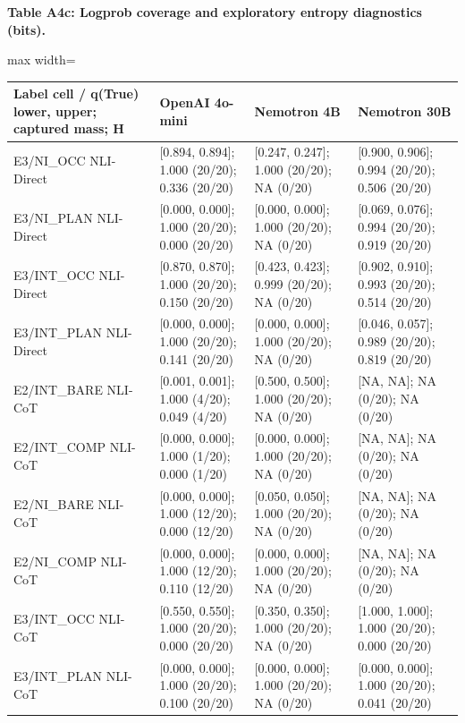 \documentclass[11pt,a4paper]{article}
\begin{document}
\textbf{Table A4c: Logprob coverage and exploratory entropy diagnostics (bits).}

\begin{center}\begingroup\small\setlength{\tabcolsep}{4.5pt}\renewcommand{\arraystretch}{1.12}\begin{adjustbox}{max width=\textwidth}\begin{tabular}{llll}\toprule
\textbf{Label cell / q(True) lower, upper; captured mass; H} & \textbf{OpenAI 4o-mini} & \textbf{Nemotron 4B} & \textbf{Nemotron 30B} \\ \midrule
E3/NI\_\allowbreak{}OCC NLI-Direct & [0.894, 0.894]; 1.000 (20/20); 0.336 (20/20) & [0.247, 0.247]; 1.000 (20/20); NA (0/20) & [0.900, 0.906]; 0.994 (20/20); 0.506 (20/20) \\
E3/NI\_\allowbreak{}PLAN NLI-Direct & [0.000, 0.000]; 1.000 (20/20); 0.000 (20/20) & [0.000, 0.000]; 1.000 (20/20); NA (0/20) & [0.069, 0.076]; 0.994 (20/20); 0.919 (20/20) \\
E3/INT\_\allowbreak{}OCC NLI-Direct & [0.870, 0.870]; 1.000 (20/20); 0.150 (20/20) & [0.423, 0.423]; 0.999 (20/20); NA (0/20) & [0.902, 0.910]; 0.993 (20/20); 0.514 (20/20) \\
E3/INT\_\allowbreak{}PLAN NLI-Direct & [0.000, 0.000]; 1.000 (20/20); 0.141 (20/20) & [0.000, 0.000]; 1.000 (20/20); NA (0/20) & [0.046, 0.057]; 0.989 (20/20); 0.819 (20/20) \\
E2/INT\_\allowbreak{}BARE NLI-CoT & [0.001, 0.001]; 1.000 (4/20); 0.049 (4/20) & [0.500, 0.500]; 1.000 (20/20); NA (0/20) & [NA, NA]; NA (0/20); NA (0/20) \\
E2/INT\_\allowbreak{}COMP NLI-CoT & [0.000, 0.000]; 1.000 (1/20); 0.000 (1/20) & [0.000, 0.000]; 1.000 (20/20); NA (0/20) & [NA, NA]; NA (0/20); NA (0/20) \\
E2/NI\_\allowbreak{}BARE NLI-CoT & [0.000, 0.000]; 1.000 (12/20); 0.000 (12/20) & [0.050, 0.050]; 1.000 (20/20); NA (0/20) & [NA, NA]; NA (0/20); NA (0/20) \\
E2/NI\_\allowbreak{}COMP NLI-CoT & [0.000, 0.000]; 1.000 (12/20); 0.110 (12/20) & [0.000, 0.000]; 1.000 (20/20); NA (0/20) & [NA, NA]; NA (0/20); NA (0/20) \\
E3/INT\_\allowbreak{}OCC NLI-CoT & [0.550, 0.550]; 1.000 (20/20); 0.000 (20/20) & [0.350, 0.350]; 1.000 (20/20); NA (0/20) & [1.000, 1.000]; 1.000 (20/20); 0.000 (20/20) \\
E3/INT\_\allowbreak{}PLAN NLI-CoT & [0.000, 0.000]; 1.000 (20/20); 0.100 (20/20) & [0.000, 0.000]; 1.000 (20/20); NA (0/20) & [0.000, 0.000]; 1.000 (20/20); 0.041 (20/20) \\

\end{tabular}
\end{adjustbox}
\end{center}
\end{document}
